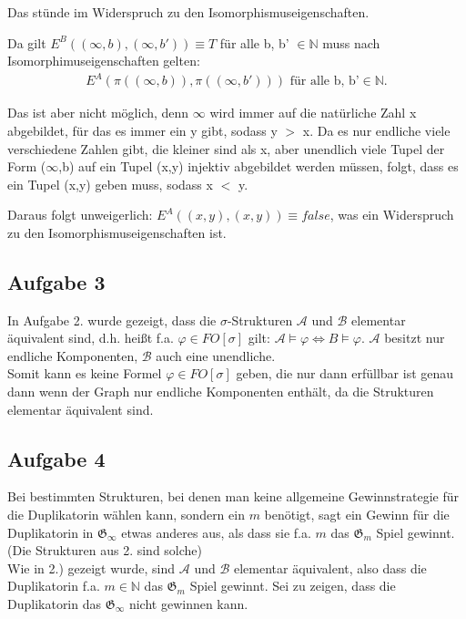 \documentclass[a4paper,10pt]{article}
\newcommand{\N}{\mathbb{N}}
\begin{document}
	Das stünde im Widerspruch zu den Isomorphismuseigenschaften.
	
	Da gilt $E^B((\infty, b),(\infty, b')) \equiv T$ für alle b, b' $\in \mathbb{N}$ muss nach Isomorphimuseigenschaften gelten:
	\begin{align*}
		E^A(\pi((\infty, b)),\pi((\infty, b'))) \text{ für alle b, b'} \in \mathbb{N}. 
	\end{align*}
	
	Das ist aber nicht möglich, denn $\infty$ wird immer auf die natürliche Zahl x abgebildet, für das es immer ein y gibt, sodass y $>$ x. 
	Da es nur endliche viele verschiedene Zahlen gibt, die kleiner sind als x, aber unendlich viele Tupel der Form ($\infty$,b) auf ein Tupel 			(x,y) injektiv abgebildet werden müssen, folgt, dass es ein Tupel (x,y) geben muss, sodass x $<$ y.
	
	Daraus folgt unweigerlich:
	$E^A((x,y),(x,y)) \equiv false$, was ein Widerspruch zu den Isomorphismuseigenschaften ist.
	
	
\subsection*{Aufgabe 3}
In Aufgabe 2. wurde gezeigt, dass die $\sigma$-Strukturen $\mathcal{A}$ und $\mathcal{B}$ elementar äquivalent sind, d.h. heißt f.a. $\varphi \in FO[\sigma]$ gilt: $\mathcal{A} \vDash \varphi \Leftrightarrow B \vDash \varphi$. $\mathcal{A}$ besitzt nur endliche Komponenten, $\mathcal{B}$ auch eine unendliche. \\Somit kann es keine Formel $\varphi \in FO[\sigma]$ geben, die nur dann erfüllbar ist genau dann wenn der Graph nur endliche Komponenten enthält, da die Strukturen elementar äquivalent sind.


\subsection*{Aufgabe 4}

Bei bestimmten Strukturen, bei denen man keine allgemeine Gewinnstrategie für die Duplikatorin wählen kann, sondern ein $m$ benötigt, sagt ein Gewinn für die Duplikatorin in $\mathfrak{G}_{\infty}$ etwas anderes aus, als dass sie f.a. $m $ das $\mathfrak{G}_m$ Spiel gewinnt. (Die Strukturen aus 2. sind solche) \\

Wie in 2.) gezeigt wurde, sind $\mathcal{A}$ und $\mathcal{B}$ elementar äquivalent, also dass die Duplikatorin f.a. $m \in \N$ das $\mathfrak{G}_m$ Spiel gewinnt.
Sei zu zeigen, dass die Duplikatorin das $\mathfrak{G}_{\infty}$ nicht gewinnen kann. \\
\end{document}
